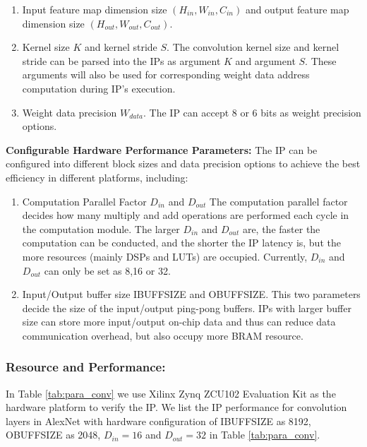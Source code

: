 \documentclass[a4paper, 11pt]{article}
\begin{document}
\begin{enumerate}
    \item {
    Input feature map dimension size $(H_{in}, W_{in}, C_{in})$ and
    output feature map dimension size $(H_{out}, W_{out}, C_{out})$.
    }
    
    \item {
    Kernel size $K$ and kernel stride $S$. The convolution kernel size and kernel stride can be parsed into the IPs as argument $K$ and argument $S$. These arguments will also be used for corresponding weight data address computation during IP's execution.
    }
    \item {
    Weight data precision $W_{data}$.
    The IP can accept 8 or 6 bits as weight precision options.  
    }
\end{enumerate}
    
    
    \textbf{Configurable Hardware Performance Parameters:}
    The IP can be configured into different block sizes and data precision options to achieve the best efficiency in different platforms, including:
    
    \begin{enumerate}

    \item {
    Computation Parallel Factor $D_{in}$ and $D_{out}$
    The computation parallel factor decides how many multiply and add operations are performed each cycle in the computation module.
    The larger $D_{in}$ and $D_{out}$ are, the faster the computation can be conducted, and the shorter the IP latency is, but the more resources (mainly DSPs and LUTs) are occupied. Currently, $D_{in}$ and $D_{out}$ can only be set as 8,16 or 32.
    }
    \item {
    Input/Output buffer size IBUFFSIZE and OBUFFSIZE.
    This two parameters decide the size of the input/output ping-pong buffers. IPs with larger buffer size can store more input/output on-chip data and thus can reduce data communication overhead, but also occupy more BRAM resource.
    }
\end{enumerate}

    

\subsubsection{Resource and Performance: } 
In Table \ref{tab:para_conv} 
    we use Xilinx Zynq ZCU102 Evaluation Kit as the hardware platform to verify the IP.
    We list the IP performance for convolution layers in AlexNet with hardware configuration of IBUFFSIZE as 8192, OBUFFSIZE as 2048, $D_{in}=16$ and $D_{out}=32$ in Table \ref{tab:para_conv}.
\end{document}
